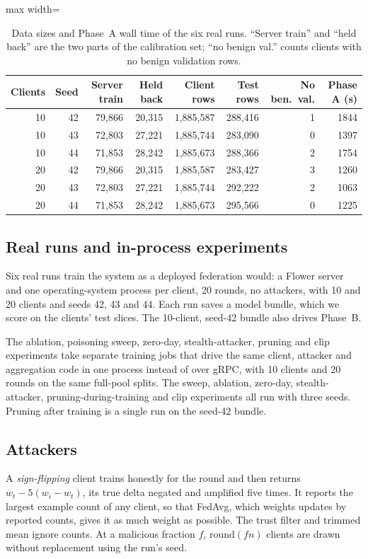 \begin{table}[t]
\centering
\caption{Data sizes and Phase~A wall time of the six real runs. ``Server train'' and ``held back'' are the two parts of the calibration set; ``no benign val.'' counts clients with no benign validation rows.}
\label{tab:sizes}
\small
\setlength{\tabcolsep}{3pt}
\begin{adjustbox}{max width=\linewidth}
\begin{tabular}{rrrrrrrr}
\toprule
Clients & Seed & Server train & Held back & Client rows & Test rows & No ben.\ val. & Phase A (s) \\
\midrule
10 & 42 & 79,866 & 20,315 & 1,885,587 & 288,416 & 1 & 1844 \\
10 & 43 & 72,803 & 27,221 & 1,885,744 & 283,090 & 0 & 1397 \\
10 & 44 & 71,853 & 28,242 & 1,885,673 & 288,366 & 2 & 1754 \\
20 & 42 & 79,866 & 20,315 & 1,885,587 & 283,427 & 3 & 1260 \\
20 & 43 & 72,803 & 27,221 & 1,885,744 & 292,222 & 2 & 1063 \\
20 & 44 & 71,853 & 28,242 & 1,885,673 & 295,566 & 0 & 1225 \\
\bottomrule
\end{tabular}
\end{adjustbox}
\end{table}

\subsection{Real runs and in-process experiments}
Six real runs train the system as a deployed federation would: a Flower server and one operating-system process per client, 20 rounds, no attackers, with 10 and 20 clients and seeds 42, 43 and 44. Each run saves a model bundle, which we score on the clients' test slices. The 10-client, seed-42 bundle also drives Phase~B.

The ablation, poisoning sweep, zero-day, stealth-attacker, pruning and clip experiments take separate training jobs that drive the same client, attacker and aggregation code in one process instead of over gRPC, with 10 clients and 20 rounds on the same full-pool splits. The sweep, ablation, zero-day, stealth-attacker, pruning-during-training and clip experiments all run with three seeds. Pruning after training is a single run on the seed-42 bundle.

\subsection{Attackers}
\label{sec:attackers}
A \emph{sign-flipping} client trains honestly for the round and then returns $w_t-5(w_i-w_t)$, its true delta negated and amplified five times. It reports the largest example count of any client, so that FedAvg, which weights updates by reported counts, gives it as much weight as possible. The trust filter and trimmed mean ignore counts. At a malicious fraction $f$, $\mathrm{round}(fn)$ clients are drawn without replacement using the run's seed.

